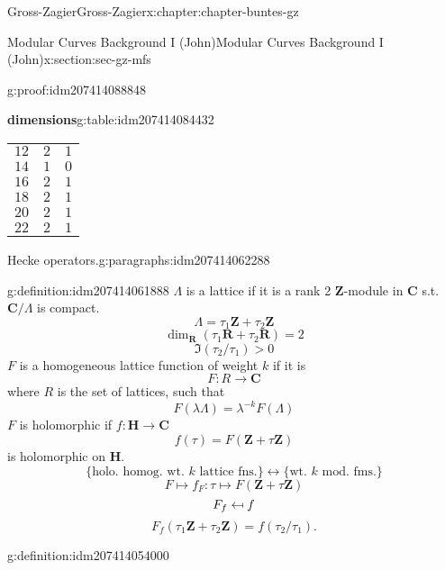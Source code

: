 \documentclass[oneside,10pt,]{book}
\numberwithin{equation}{section}
\providecommand\mapsfrom{\mathrel{\reflectbox{\ensuremath{\mapsto}}}}
\newcommand{\ZZ}{\mathbf{Z}}
\newcommand{\RR}{\mathbf{R}}
\newcommand{\CC}{\mathbf{C}}
\newcommand{\HH}{\mathbf{H}}
\newcommand{\gt}{>}
\begin{document}
\begin{chapterptx}{Gross-Zagier}{}{Gross-Zagier}{}{}{x:chapter:chapter-buntes-gz}
\begin{sectionptx}{Modular Curves Background I (John)}{}{Modular Curves Background I (John)}{}{}{x:section:sec-gz-mfs}
\begin{proofptx}{}{g:proof:idm207414088848}
\begin{tableptx}{\textbf{dimensions}}{g:table:idm207414084432}{}
\begin{tabular}{lll}
\(12\)&\(2\)&\(1\)\tabularnewline[0pt]
\(14\)&\(1\)&\(0\)\tabularnewline[0pt]
\(16\)&\(2\)&\(1\)\tabularnewline[0pt]
\(18\)&\(2\)&\(1\)\tabularnewline[0pt]
\(20\)&\(2\)&\(1\)\tabularnewline[0pt]
\(22\)&\(2\)&\(1\)
\end{tabular}
\end{tableptx}%
\end{proofptx}
\begin{paragraphs}{Hecke operators.}{g:paragraphs:idm207414062288}%
\begin{definition}{}{g:definition:idm207414061888}%
\(\Lambda \) is a lattice if it is a rank 2 \(\ZZ\)-module in \(\CC\) s.t. \(\CC/\Lambda \) is compact.%
\begin{equation*}
\Lambda = \tau _1\ZZ + \tau _2 \ZZ
\end{equation*}
%
\begin{equation*}
\dim_\RR(\tau _1 \RR + \tau _2\RR) = 2
\end{equation*}
%
\begin{equation*}
\Im (\tau _2 / \tau _1 ) \gt 0
\end{equation*}
\(F\) is a homogeneous lattice function of weight \(k\) if it is%
\begin{equation*}
F\colon R \to \CC
\end{equation*}
where \(R\) is the set of lattices, such that%
\begin{equation*}
F(\lambda \Lambda ) = \lambda ^{-k}F(\Lambda )
\end{equation*}
\(F\) is holomorphic if \(f\colon  \HH \to \CC\)%
\begin{equation*}
f(\tau ) = F(\ZZ + \tau \ZZ)
\end{equation*}
is holomorphic on \(\HH\).%
\begin{equation*}
\{\text{holo. homog. wt. }k\text{ lattice fns.}\}\leftrightarrow \{\text{wt. }k\text{ mod. fms.}\}
\end{equation*}
%
\begin{equation*}
F\mapsto f_F\colon \tau  \mapsto F(\ZZ+ \tau \ZZ)
\end{equation*}
%
\begin{equation*}
F_f \mapsfrom f
\end{equation*}
%
\begin{equation*}
F_f (\tau _1 \ZZ+ \tau _2 \ZZ) = f(\tau _2/\tau _1)\text{.}
\end{equation*}
%
\end{definition}
\begin{definition}{}{g:definition:idm207414054000}%

\end{definition}
\end{paragraphs}
\end{sectionptx}
\end{chapterptx}
\end{document}
